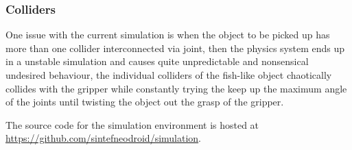 \subsubsection{Colliders}

One issue with the current simulation is when the object to be picked up has more than one collider interconnected via joint, then the \cite{unityphysics} physics system ends up in a unstable simulation and causes quite unpredictable and nonsensical undesired behaviour, the individual colliders of the fish-like object chaotically collides with the gripper while constantly trying the keep up the maximum angle of the joints until twisting the object out the grasp of the gripper.

The source code for the simulation environment is hosted at \url{https://github.com/sintefneodroid/simulation}.